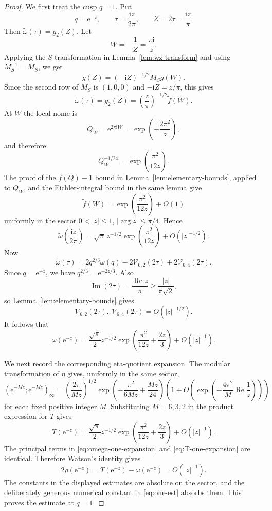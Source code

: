 \documentclass[10pt,a4paper]{amsart}
\newcommand{\ii}{\mathrm i}
\newcommand{\e}{\mathrm e}
\newcommand{\Repart}{\operatorname{Re}}
\newcommand{\Impart}{\operatorname{Im}}
\begin{document}
\begin{proof}
We first treat the cusp $q=1$.  Put
\[
q=\e^{-z},\qquad \tau=\frac{\ii z}{2\pi},\qquad Z=2\tau=\frac{\ii z}{\pi}.
\]
Then $\widetilde\omega(\tau)=g_2(Z)$.  Let
\[
W=-\frac1Z=\frac{\pi\ii}{z}.
\]
Applying the $S$-transformation in Lemma~\ref{lem:wz-transform} and using
$M_S^{-1}=M_S$, we get
\[
g(Z)=(-\ii Z)^{-1/2}M_Sg(W).
\]
Since the second row of $M_S$ is $(1,0,0)$ and $-\ii Z=z/\pi$, this gives
\begin{equation}\label{eq:omega-at-one-transform}
\widetilde\omega(\tau)=g_2(Z)=\left(\frac{z}{\pi}\right)^{-1/2}\widetilde f(W).
\end{equation}
At $W$ the local nome is
\[
Q_W=\e^{2\pi\ii W}=\exp\left(-\frac{2\pi^2}{z}\right),
\]
and therefore
\[
Q_W^{-1/24}=\exp\left(\frac{\pi^2}{12z}\right).
\]
The proof of the $f(Q)-1$ bound in Lemma~\ref{lem:elementary-bounds}, applied to $Q_W$, and the Eichler-integral bound in the same lemma give
\[
\widetilde f(W)
=
\exp\left(\frac{\pi^2}{12z}\right)+O(1)
\]
uniformly in the sector $0<|z|\leq1$, $|\arg z|\leq\pi/4$.  Hence
\begin{equation}\label{eq:tilde-omega-one-expansion}
\widetilde\omega\left(\frac{\ii z}{2\pi}\right)
=
\sqrt\pi\,z^{-1/2}
\exp\left(\frac{\pi^2}{12z}\right)
+
O(|z|^{-1/2}).
\end{equation}
Now
\[
\widetilde\omega(\tau)
=
2q^{2/3}\omega(q)-2\mathcal V_{6,2}(2\tau)+2\mathcal V_{6,4}(2\tau).
\]
Since $q=\e^{-z}$, we have $q^{2/3}=\e^{-2z/3}$.  Also
\[
\Impart(2\tau)=\frac{\Repart z}{\pi}\geq \frac{|z|}{\pi\sqrt2},
\]
so Lemma~\ref{lem:elementary-bounds} gives
\[
\mathcal V_{6,2}(2\tau),\ \mathcal V_{6,4}(2\tau)=O(|z|^{-1/2}).
\]
It follows that
\begin{equation}\label{eq:omega-one-expansion}
\omega(\e^{-z})
=
\frac{\sqrt\pi}{2}z^{-1/2}
\exp\left(\frac{\pi^2}{12z}+\frac{2z}{3}\right)
+
O(|z|^{-1}).
\end{equation}

We next record the corresponding eta-quotient expansion.  The modular transformation of
$\eta$ gives, uniformly in the same sector,
\[
(\e^{-Mz};\e^{-Mz})_\infty
=
\left(\frac{2\pi}{Mz}\right)^{1/2}
\exp\left(-\frac{\pi^2}{6Mz}+\frac{Mz}{24}\right)
\left(1+O\left(\exp\left(-\frac{4\pi^2}{M}\Repart\frac1z\right)\right)\right)
\]
for each fixed positive integer $M$.  Substituting $M=6,3,2$ in the product expression for
$T$ gives
\begin{equation}\label{eq:T-one-expansion}
T(\e^{-z})
=
\frac{\sqrt\pi}{2}z^{-1/2}
\exp\left(\frac{\pi^2}{12z}+\frac{2z}{3}\right)
+
O(|z|^{-1}).
\end{equation}
The principal terms in \eqref{eq:omega-one-expansion} and \eqref{eq:T-one-expansion} are identical.  Therefore Watson's identity gives
\[
2\rho(\e^{-z})=T(\e^{-z})-\omega(\e^{-z})=O(|z|^{-1}).
\]
The constants in the displayed estimates are absolute on the sector, and the deliberately generous numerical constant in \eqref{eq:one-est} absorbs them.  This proves the estimate at $q=1$.


\end{proof}
\end{document}

